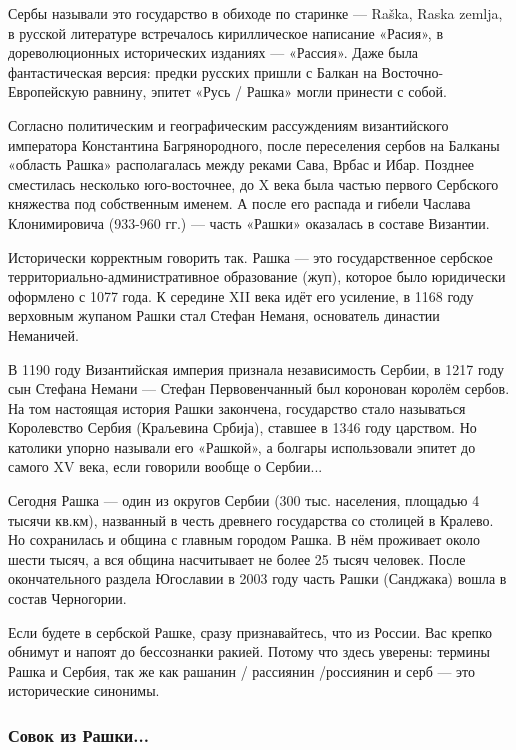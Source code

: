 Сербы называли это государство в обиходе по старинке — Raška, Raska zemlja, в
русской литературе встречалось кириллическое написание «Расия», в
дореволюционных исторических изданиях — «Рассия». Даже была фантастическая
версия: предки русских пришли с Балкан на Восточно-Европейскую равнину, эпитет
«Русь / Рашка» могли принести с собой.

Согласно политическим и географическим рассуждениям византийского императора
Константина Багрянородного, после переселения сербов на Балканы «область Рашка»
располагалась между реками Сава, Врбас и Ибар. Позднее сместилась несколько
юго-восточнее, до X века была частью первого Сербского княжества под
собственным именем. А после его распада и гибели Часлава Клонимировича (933-960
гг.) — часть «Рашки» оказалась в составе Византии.


Исторически корректным говорить так. Рашка — это государственное сербское
территориально-административное образование (жуп), которое было юридически
оформлено с 1077 года. К середине XII века идёт его усиление, в 1168 году
верховным жупаном Рашки стал Стефан Неманя, основатель династии Неманичей.

В 1190 году Византийская империя признала независимость Сербии, в 1217 году сын
Стефана Немани — Стефан Первовенчанный был коронован королём сербов. На том
настоящая история Рашки закончена, государство стало называться Королевство
Сербия (Краљевина Србија), ставшее в 1346 году царством. Но католики упорно
называли его «Рашкой», а болгары использовали эпитет до самого XV века, если
говорили вообще о Сербии...

Сегодня Рашка — один из округов Сербии (300 тыс. населения, площадью 4 тысячи
кв.км), названный в честь древнего государства со столицей в Кралево. Но
сохранилась и община с главным городом Рашка. В нём проживает около шести
тысяч, а вся община насчитывает не более 25 тысяч человек. После окончательного
раздела Югославии в 2003 году часть Рашки (Санджака) вошла в состав Черногории.

Если будете в сербской Рашке, сразу признавайтесь, что из России. Вас крепко
обнимут и напоят до бессознанки ракией. Потому что здесь уверены: термины Рашка
и Сербия, так же как рашанин / рассиянин /россиянин и серб — это исторические
синонимы.

\subsubsection{Совок из Рашки...}

